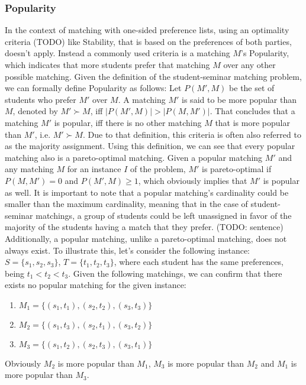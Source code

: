 \subsubsection{Popularity}
In the context of matching with one-sided preference lists, using an optimality criteria (TODO) like Stability, that is based on the preferences of both parties, doesn't apply. Instead a commonly used criteria is a matching $M$'s Popularity, which indicates that more students prefer that matching $M$ over any other possible matching.\cite{ManlovePopularMatchings} Given the definition of the student-seminar matching problem, we can formally define Popularity as follows:
Let $P(M', M)$ be the set of students who prefer $M'$ over $M$. A matching $M'$ is said to be more popular than $M$, denoted by $M' \succ M$, iff $|P(M', M)| > |P(M, M')|$. That concludes that a matching $M'$ is popular, iff there is no other matching $M$ that is more popular than $M'$, i.e. $M' \succ M$.\cite{Klaus, AbrahamPopular} Due to that definition, this criteria is often also referred to as the majority assignment.\cite{Gardenfors}
\newline
Using this definition, we can see that every popular matching also is a pareto-optimal matching. Given a popular matching $M'$ and any matching $M$ for an instance $I$ of the problem, $M'$ is pareto-optimal if $P(M, M') = 0$ and $P(M', M) \geq 1$, which obviously implies that $M'$ is popular as well.\cite{Klaus}
\newline
It is important to note that a popular matching's cardinality could be smaller than the maximum cardinality, meaning that in the case of student-seminar matchings, a group of students could be left unassigned in favor of the majority of the students having a match that they prefer. (TODO: sentence)
Additionally, a popular matching, unlike a pareto-optimal matching, does not always exist. To illustrate this, let's consider the following instance: $S=\{s_1, s_2, s_3\}$, $T=\{t_1, t_2, t_3\}$, where each student has the same preferences, being $t_1 < t_2 < t_3$. Given the following matchings, we can confirm that there exists no popular matching for the given instance: 
\begin{enumerate}
    \item $M_1=\{(s_1, t_1), (s_2, t_2), (s_3, t_3)\}$
    \item $M_2=\{(s_1, t_3), (s_2, t_1), (s_3, t_2)\}$
    \item $M_3=\{(s_1, t_2), (s_2, t_3), (s_3, t_1)\}$
\end{enumerate}
Obviously $M_2$ is more popular than $M_1$, $M_3$ is more popular than $M_2$ and $M_1$ is more popular than $M_3$.\cite{AbrahamPopular}

